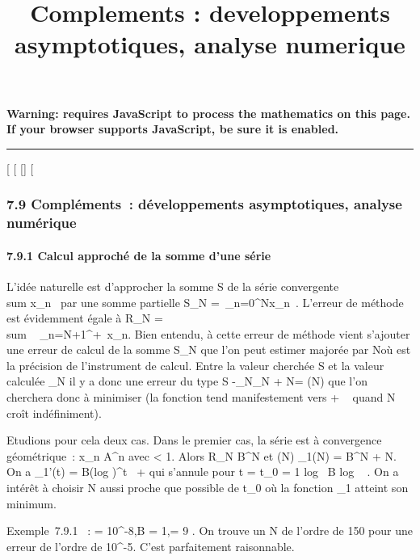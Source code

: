 \documentclass[]{article}
\title{Complements : developpements asymptotiques, analyse numerique}
\author{}
\date{}
\begin{document}
\maketitle

\textbf{Warning: 
requires JavaScript to process the mathematics on this page.\\ If your
browser supports JavaScript, be sure it is enabled.}

\begin{center}\rule{3in}{0.4pt}\end{center}

[
[
[]
[

\subsubsection{7.9 Compléments~: développements asymptotiques, analyse
numérique}

\paragraph{7.9.1 Calcul approché de la somme d'une série}

L'idée naturelle est d'approcher la somme S de la série convergente
\\sum  x_n~ par
une somme partielle S_N =\
\sum  _n=0^Nx_n~.
L'erreur de méthode est évidemment égale à R_N
= \\sum ~
_n=N+1^+\infty~x_n. Bien entendu, à cette erreur de
méthode vient s'ajouter une erreur de calcul de la somme S_N
que l'on peut estimer majorée par N\epsilon où \epsilon est la précision de
l'instrument de calcul. Entre la valeur cherchée S et la valeur calculée
\overlineS_N il y a donc une erreur du type
S
-\overlineS_N\leqR_N
+ N\epsilon = \delta(N) que l'on cherchera donc à minimiser (la fonction \delta tend
manifestement vers + \infty~ quand N croît indéfiniment).

Etudions pour cela deux cas. Dans le premier cas, la série est à
convergence géométrique~: x_n\leq
A\rho^n avec \rho < 1. Alors R_N \leq
B\rho^N et \delta(N) \leq \delta_1(N) = B\rho^N + N\epsilon. On a
\delta_1'(t) = B(log \rho)\rho^t~ + \epsilon
qui s'annule pour t = t_0 = 1 \over \rho
 log~ \left  \epsilon
\over B log \rho~
\right . On a intérêt à choisir N aussi proche
que possible de t_0 où la fonction \delta_1 atteint son
minimum.

Exemple~7.9.1 ~: \epsilon = 10^-8,B = 1,\rho = 9  . On trouve un N de l'ordre de 150 pour une erreur de l'ordre de
10^-5. C'est parfaitement raisonnable.
\end{document}
